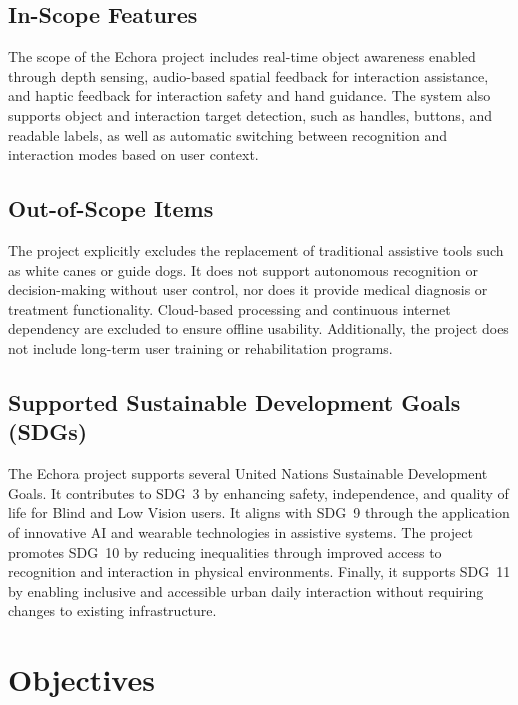 \subsection{In-Scope Features}
\label{subsubsec:in_scope_features}

The scope of the Echora project includes real-time object awareness enabled through depth sensing, audio-based spatial feedback for interaction assistance, and haptic feedback for interaction safety and hand guidance. The system also supports object and interaction target detection, such as handles, buttons, and readable labels, as well as automatic switching between recognition and interaction modes based on user context.

\subsection{Out-of-Scope Items}
\label{subsubsec:out_of_scope}

The project explicitly excludes the replacement of traditional assistive tools such as white canes or guide dogs. It does not support autonomous recognition or decision-making without user control, nor does it provide medical diagnosis or treatment functionality. Cloud-based processing and continuous internet dependency are excluded to ensure offline usability. Additionally, the project does not include long-term user training or rehabilitation programs.

\subsection{Supported Sustainable Development Goals (SDGs)}
\label{subsubsec:sdgs}

The Echora project supports several United Nations Sustainable Development Goals. It contributes to SDG~3 by enhancing safety, independence, and quality of life for Blind and Low Vision users. It aligns with SDG~9 through the application of innovative AI and wearable technologies in assistive systems. The project promotes SDG~10 by reducing inequalities through improved access to recognition and interaction in physical environments. Finally, it supports SDG~11 by enabling inclusive and accessible urban daily interaction without requiring changes to existing infrastructure.

\section{Objectives}
\label{subsec:objectives}

